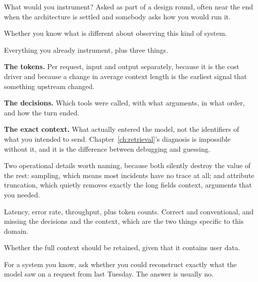\begin{bankq}{What would you instrument?}
\qasked
Asked as part of a design round, often near the end when the architecture is
settled and somebody asks how you would run it.

\qtested
Whether you know what is different about observing this kind of system.

\qstaff
Everything you already instrument, plus three things.

\textbf{The tokens.} Per request, input and output separately, because it is
the cost driver and because a change in average context length is the earliest
signal that something upstream changed.

\textbf{The decisions.} Which tools were called, with what arguments, in what
order, and how the turn ended. 

\textbf{The exact context.} What actually entered the model, not the identifiers
of what you intended to send. Chapter~\ref{ch:retrieval}'s diagnosis is
impossible without it, and it is the difference between debugging and guessing.

Two operational details worth naming, because both silently destroy the value
of the rest: sampling, which means most incidents have no trace at all; and
attribute truncation, which quietly removes exactly the long fields \dash{}
context, arguments \dash{} that you needed.

\qsenior
Latency, error rate, throughput, plus token counts. Correct and conventional,
and missing the decisions and the context, which are the two things specific to
this domain.

\qcontested
Whether the full context should be retained, given that it contains user data.

\qdrill
For a system you know, ask whether you could reconstruct exactly what the model
saw on a request from last Tuesday. The answer is usually no.
\end{bankq}

